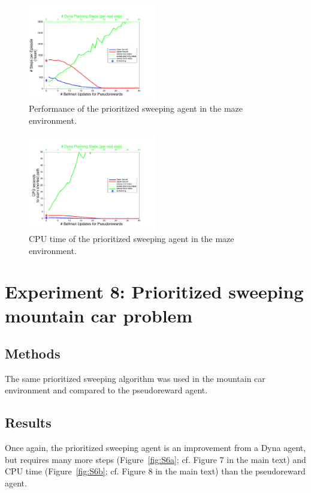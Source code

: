 \documentclass[letterpaper]{article}
\begin{document}
\begin{figure}[ht]
\centering
\includegraphics[width=0.5\textwidth]{learning_vs_PRiterationsSweeping_DYNA_mean}
\caption{Performance of the prioritized sweeping agent in the maze environment.}
\label{fig:S5a}
\end{figure}

\begin{figure}[ht]
\centering
\includegraphics[width=0.5\textwidth]{cpus_vs_PRiterations_sweeping_toGoal}
\caption{CPU time of the prioritized sweeping agent in the maze environment.}
\label{fig:S5b}
\end{figure}

\section{Experiment 8: Prioritized sweeping mountain car problem}

\subsection{Methods}

The same prioritized sweeping algorithm was used in the mountain car environment and compared to the pseudoreward agent.

\subsection{Results}

Once again, the prioritized sweeping agent is an improvement from a Dyna agent, but requires many more steps (Figure~\ref{fig:S6a}; cf. Figure 7 in the main text) and CPU time (Figure~\ref{fig:S6b}; cf. Figure 8 in the main text) than the pseudoreward agent.
\end{document}
